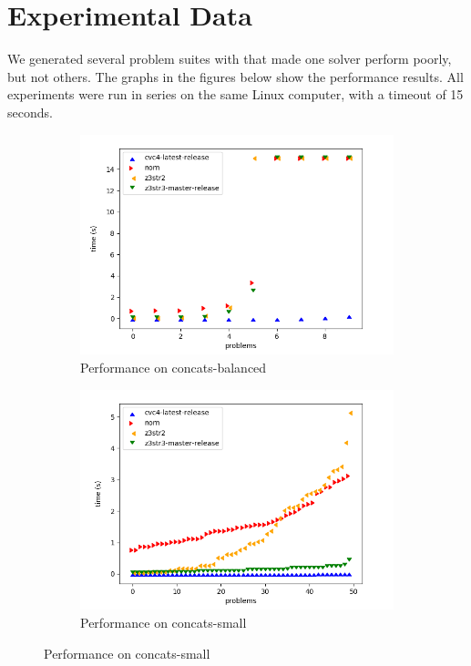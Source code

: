 \section{Experimental Data}

    We generated several problem suites with \fuzzer{} that made one solver perform poorly, but not others. The graphs in the figures below show the performance results. All experiments were run in series on the same Linux computer, with a timeout of 15 seconds.

    \begin{figure}[H]
        \begin{subfigure}{.5\textwidth}
            \caption{Performance on concats-balanced}
            \label{fig:concats-balanced}
            \includegraphics[width=\textwidth]{data/graphs/concats-balanced.png}
        \end{subfigure}
        \begin{subfigure}{.5\textwidth}
            \caption{Performance on concats-small}
            \label{fig:concats-small}
            \includegraphics[width=\textwidth]{data/graphs/concats-small.png}

\end{subfigure}
\end{figure}

